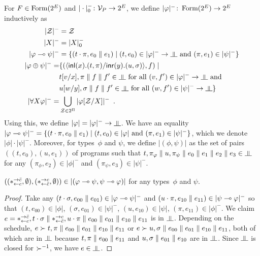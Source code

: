 \renewcommand{\sem}[1]{|{#1}|}
\newcommand{\nsem}[1]{\sem{#1}^-}
\newcommand{\sempair}[1]{\sem{(#1)}}
For $F\in\mathop{\text{Form}}(2^E)$ and $|\cdot|^-_0\colon\mathcal V_P\rightarrow 2^E$,
we define $\nsem{\phi}\colon \form(2^E)\rightarrow
2^E$ inductively as
\begin{align*}
 \nsem{\mathcal Z} &= \mathcal Z \\
 \nsem{X}&= |X|_0^- \\
 \nsem{\phi\limp\psi}&=
 \{(t\cdot\pi, e_0\conc e_1)\mid
 (t,e_0)\in\nsem\phi\rightarrow\bbot \text{ and }(\pi,e_1)\in\nsem\psi\}\\
 \nsem{\phi\oplus\psi}=& \{(\mats x{t}{\pi}y{u}{\sigma}, f)\mid\\ &
 t[v/x],\pi\conc f\conc f'\in\bbot \text{ for all } (v,f')\in\nsem{\phi}\rightarrow\bbot\text{
 and }\\ &
 u[w/y],\sigma\conc f\conc f'\in\bbot \text{ for all } (w,f')\in\nsem{\psi}\rightarrow\bbot\}
 \\
 \nsem{\forall X\phi}=&
 \bigcup_{\mathcal Z\in 2^\Pi} \nsem{\phi[\mathcal Z/X]}\enspace.
\end{align*}
Using this, we define $\sem \phi=\nsem{\phi}\rightarrow\bbot$.
We have an equality
$\nsem{\phi\limp\psi} = \{(t\cdot\pi, e_0\conc e_1)\mid
(t,e_0)\in\sem\phi\text{ and }(\pi,e_1)\in\nsem\psi\}$, which we denote
$\sem{\phi}\cdot\nsem{\psi}$.
Moreover, for types~$\phi$ and $\psi$, we define $\sempair{\phi,\psi}$
as the set of pairs $((t,e_0),(u,e_1))$ of programs such
that
$t,\pi_\phi\conc u,\pi_\psi\conc e_0\conc e_1\conc e_2\conc e_3
\in\bbot$ for any $(\pi_\phi,e_2)\in\nsem\phi$
and $(\pi_\psi,e_3)\in\nsem\psi$.

\begin{proposition}
 \label{comod-type}
 $((\comodL,\emptyset), (\comodR,\emptyset))\in\sempair{\phi\limp\psi,\psi\limp\phi}$
 for any types~$\phi$ and $\psi$.
\end{proposition}
\begin{proof}
 Take any $(t\cdot\sigma,e_{00}\conc e_{01})\in\nsem{\phi\limp\psi}$
 and $(u\cdot\pi,e_{10}\conc e_{11})\in\nsem{\psi\limp\phi}$ so that
 $(t, e_{00})\in\sem{\phi}$, $(\sigma,e_{01})\in\nsem{\psi}$,
 $(u, e_{10})\in\sem{\psi}$, $(\pi,e_{11})\in\nsem{\phi}$.
 We claim $e=\ast^{\rightarrow {\bar{c}}}_{\leftarrow{c}},t\cdot\sigma\parallel\ast^{\rightarrow {c}}_{\leftarrow{\bar{c}}},u\cdot\pi\parallel
 e_{00}\parallel e_{01}\parallel e_{10}\parallel e_{11}$ is in
 $\bbot$.
 Depending on the schedule,
 $e\succ t,\pi\parallel e_{00}\parallel e_{01}\parallel e_{10}\parallel e_{11}$ or
 $e\succ u,\sigma\parallel e_{00}\parallel e_{01}\parallel e_{10}\parallel e_{11}$,
 both of which are in $\bbot$ because
 $t,\pi\parallel e_{00}\parallel e_{11}$ and
 $u,\sigma\parallel e_{01}\parallel e_{10}$ are in $\bbot$.
 Since $\bbot$ is closed for $\succ^{-1}$,
 we have $e\in\bbot$.
\end{proof}

